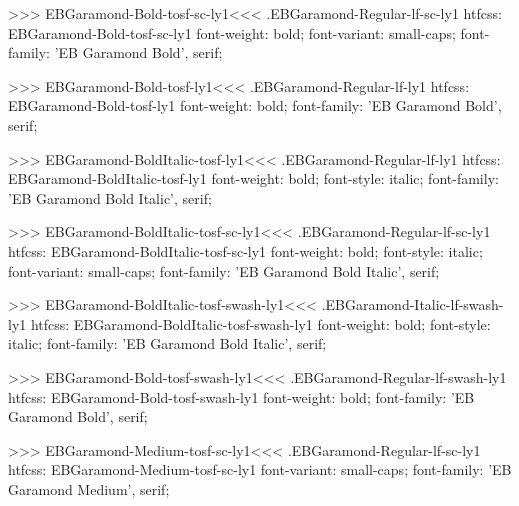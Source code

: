 {{>>>
\<EBGaramond-Bold-tosf-sc-ly1\><<<
.EBGaramond-Regular-lf-sc-ly1
htfcss:  EBGaramond-Bold-tosf-sc-ly1  font-weight: bold; font-variant: small-caps; font-family: 'EB Garamond Bold', serif;

>>>
\<EBGaramond-Bold-tosf-ly1\><<<
.EBGaramond-Regular-lf-ly1
htfcss:  EBGaramond-Bold-tosf-ly1  font-weight: bold; font-family: 'EB Garamond Bold', serif;

>>>
\<EBGaramond-BoldItalic-tosf-ly1\><<<
.EBGaramond-Regular-lf-ly1
htfcss:  EBGaramond-BoldItalic-tosf-ly1  font-weight: bold; font-style: italic; font-family: 'EB Garamond Bold Italic', serif;

>>>
\<EBGaramond-BoldItalic-tosf-sc-ly1\><<<
.EBGaramond-Regular-lf-sc-ly1
htfcss:  EBGaramond-BoldItalic-tosf-sc-ly1  font-weight: bold; font-style: italic; font-variant: small-caps; font-family: 'EB Garamond Bold Italic', serif;

>>>
\<EBGaramond-BoldItalic-tosf-swash-ly1\><<<
.EBGaramond-Italic-lf-swash-ly1
htfcss:  EBGaramond-BoldItalic-tosf-swash-ly1  font-weight: bold; font-style: italic; font-family: 'EB Garamond Bold Italic', serif;

>>>
\<EBGaramond-Bold-tosf-swash-ly1\><<<
.EBGaramond-Regular-lf-swash-ly1
htfcss:  EBGaramond-Bold-tosf-swash-ly1  font-weight: bold; font-family: 'EB Garamond Bold', serif;

>>>
\<EBGaramond-Medium-tosf-sc-ly1\><<<
.EBGaramond-Regular-lf-sc-ly1
htfcss:  EBGaramond-Medium-tosf-sc-ly1  font-variant: small-caps; font-family: 'EB Garamond Medium', serif;

}}
